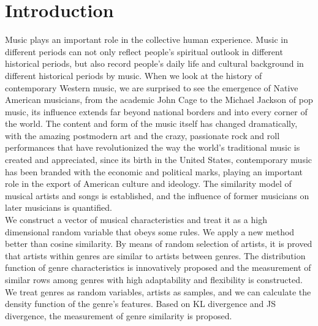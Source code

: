 \documentclass[conference]{IEEEtran}
\begin{document}
\section{Introduction}
Music plays an important role in the collective human experience. Music in different periods can not only reflect people’s spiritual outlook in different historical periods, but also record people’s daily life and cultural background in different historical periods by music. When we look at the
history of contemporary Western music, we are surprised to see the emergence of Native American
musicians, from the academic John Cage to the Michael Jackson of pop music, its influence extends far
beyond national borders and into every corner of the world. The content and form of the music itself
has changed dramatically, with the amazing postmodern art and the crazy, passionate rock and roll
performances that have revolutionized the way the world’s traditional music is created and appreciated,
since its birth in the United States, contemporary music has been branded with the economic and
political marks, playing an important role in the export of American culture and ideology.
The similarity model of musical artists and songs is established, and the influence of former musicians on later musicians is quantified. 
\\ We construct a vector of musical characteristics and treat it as a high dimensional random variable that obeys some rules. We apply a new method better than cosine similarity. By means of random selection of artists, it is proved that artists within genres are similar to artists between genres. The distribution function of genre characteristics is innovatively proposed and the measurement of similar rows among genres with high adaptability and flexibility is constructed\cite{seville}. We treat genres as
random variables, artists as samples, and we can calculate the density function of the genre's features. Based on KL divergence and JS divergence, the measurement of genre similarity is proposed.\\
\end{document}
